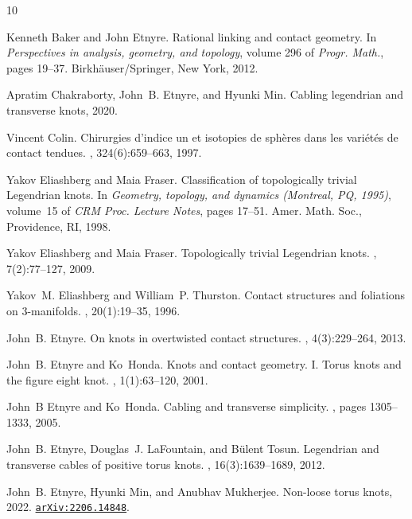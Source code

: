 \documentclass[11pt]{amsart}
\theoremstyle{plain}
\theoremstyle{definition}
\theoremstyle{remark}
\numberwithin{theorem}{section}
\begin{document}
\begin{thebibliography}{10}

Kenneth Baker and John Etnyre.
\newblock Rational linking and contact geometry.
\newblock In {\em Perspectives in analysis, geometry, and topology}, volume 296
  of {\em Progr. Math.}, pages 19--37. Birkh\"auser/Springer, New York, 2012.

Apratim Chakraborty, John~B. Etnyre, and Hyunki Min.
\newblock Cabling legendrian and transverse knots, 2020.

Vincent Colin.
\newblock Chirurgies d'indice un et isotopies de sph\`eres dans les
  vari\'et\'es de contact tendues.
, 324(6):659--663, 1997.

Yakov Eliashberg and Maia Fraser.
\newblock Classification of topologically trivial {L}egendrian knots.
\newblock In {\em Geometry, topology, and dynamics (Montreal, PQ, 1995)},
  volume~15 of {\em CRM Proc. Lecture Notes}, pages 17--51. Amer. Math. Soc.,
  Providence, RI, 1998.

Yakov Eliashberg and Maia Fraser.
\newblock Topologically trivial {L}egendrian knots.
, 7(2):77--127, 2009.

Yakov~M. Eliashberg and William~P. Thurston.
\newblock Contact structures and foliations on {$3$}-manifolds.
, 20(1):19--35, 1996.

John~B. Etnyre.
\newblock On knots in overtwisted contact structures.
, 4(3):229--264, 2013.

John~B. Etnyre and Ko~Honda.
\newblock Knots and contact geometry. {I}. {T}orus knots and the figure eight
  knot.
, 1(1):63--120, 2001.

John~B Etnyre and Ko~Honda.
\newblock Cabling and transverse simplicity.
, pages 1305--1333, 2005.

John~B. Etnyre, Douglas~J. LaFountain, and B{\"u}lent Tosun.
\newblock Legendrian and transverse cables of positive torus knots.
, 16(3):1639--1689, 2012.

John~B. Etnyre, Hyunki Min, and Anubhav Mukherjee.
\newblock Non-loose torus knots, 2022.
\newblock \href{https://arxiv.org/abs/2206.14848}{\tt arXiv:2206.14848}.


\end{thebibliography}
\end{document}
